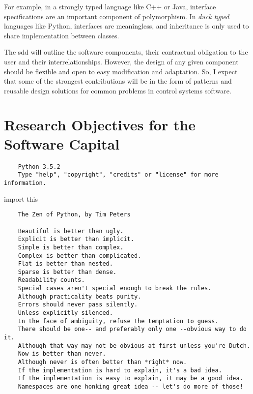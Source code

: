 For example, in a strongly typed language like C++ or Java, interface
specifications are an important component of polymorphism. In \emph{duck typed}
languages like Python, interfaces are meaningless, and inheritance is only used
to share implementation between classes.

The \ac{sdd} will outline the software components, their contractual obligation
to the user and their interrelationships. However, the design of any given
component should be flexible and open to easy modification and adaptation. So, I
expect that some of the strongest contributions will be in the form of patterns
and reusable design solutions for common problems in control systems software.


\section{Research Objectives for the Software Capital}%
\label{sec:ObjectivesForSoftwareCapital}


\begin{flushright}
\begin{minipage}{0.85\textwidth}
  \footnotesize
  {\color{git-ltgray}
  \begin{verbatim}
    Python 3.5.2
    Type "help", "copyright", "credits" or "license" for more information.
  \end{verbatim}
  }\null{}\baselineskip
  {\ttfamily
  \noindent {>}{>}{>} \textcolor{git-red}{import} this
  }
  \begin{verbatim}
    The Zen of Python, by Tim Peters

    Beautiful is better than ugly.
    Explicit is better than implicit.
    Simple is better than complex.
    Complex is better than complicated.
    Flat is better than nested.
    Sparse is better than dense.
    Readability counts.
    Special cases aren't special enough to break the rules.
    Although practicality beats purity.
    Errors should never pass silently.
    Unless explicitly silenced.
    In the face of ambiguity, refuse the temptation to guess.
    There should be one-- and preferably only one --obvious way to do it.
    Although that way may not be obvious at first unless you're Dutch.
    Now is better than never.
    Although never is often better than *right* now.
    If the implementation is hard to explain, it's a bad idea.
    If the implementation is easy to explain, it may be a good idea.
    Namespaces are one honking great idea -- let's do more of those!
  \end{verbatim}
\end{minipage}\\
\end{flushright}

